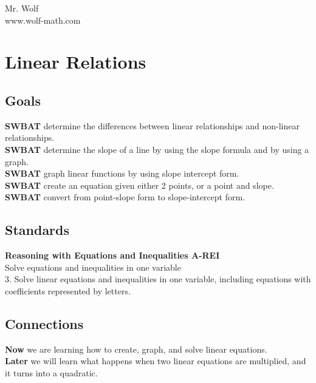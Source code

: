 \documentclass[12pt]{article}
\begin{document}
Mr. Wolf \\ www.wolf-math.com

\section*{Linear Relations}

\subsection*{Goals}

\textbf{SWBAT} determine the differences between linear relationships and non-linear relationships.\\

\textbf{SWBAT} determine the slope of a line by using the slope formula and by using a graph.\\

\textbf{SWBAT} graph linear functions by using slope intercept form.\\

\textbf{SWBAT} create an equation given either 2 points, or a point and slope.\\

\textbf{SWBAT} convert from point-slope form to slope-intercept form.



\subsection*{Standards} 

\textbf{Reasoning with Equations and Inequalities \hfill	A-REI}\\

 Solve equations and inequalities in one variable\\
 
3.	 Solve linear equations and inequalities in one variable, including
equations with coefficients represented by letters.\\



\subsection*{Connections}

\textbf{Now} we are learning how to create, graph, and solve linear equations.\\

\textbf{Later} we will learn what happens when two linear equations are multiplied, and it turns into a quadratic.
\end{document}

